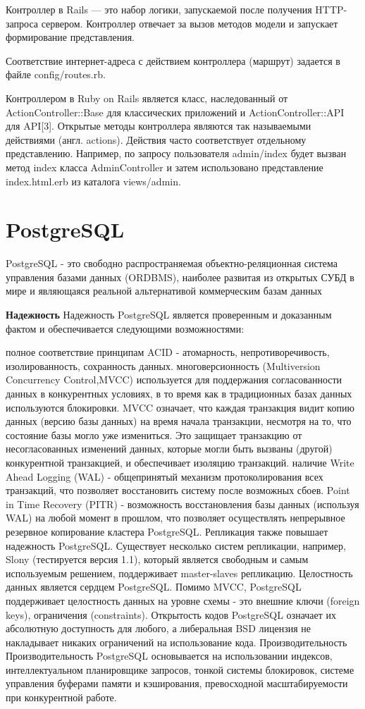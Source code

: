 Контроллер в Rails — это набор логики, запускаемой после получения HTTP-запроса сервером. Контроллер отвечает за вызов методов модели и запускает формирование представления.

Соответствие интернет-адреса с действием контроллера (маршрут) задается в файле config/routes.rb.

Контроллером в Ruby on Rails является класс, наследованный от ActionController::Base для классических приложений и ActionController::API для API[3]. Открытые методы контроллера являются так называемыми действиями (англ. actions). Действия часто соответствует отдельному представлению. Например, по запросу пользователя admin/index будет вызван метод index класса AdminController и затем использовано представление index.html.erb из каталога views/admin.

\section{PostgreSQL}\label{sec:ch3/sect3}
PostgreSQL - это свободно распространяемая объектно-реляционная система управления базами данных (ORDBMS), наиболее развитая из открытых СУБД в мире и являющаяся реальной альтернативой коммерческим базам данных

\textbf{Надежность} 
Надежность PostgreSQL является проверенным и доказанным фактом и обеспечивается следующими возможностями:

полное соответствие принципам ACID - атомарность, непротиворечивость, изолированность, сохранность данных.
многоверсионность (Multiversion Concurrency Control,MVCC) используется для поддержания согласованности данных в конкурентных условиях, в то время как в традиционных базах данных используются блокировки. MVCC означает, что каждая транзакция видит копию данных (версию базы данных) на время начала транзакции, несмотря на то, что состояние базы могло уже измениться. Это защищает транзакцию от несогласованных изменений данных, которые могли быть вызваны (другой) конкурентной транзакцией, и обеспечивает изоляцию транзакций.
наличие Write Ahead Logging (WAL) - общепринятый механизм протоколирования всех транзакций, что позволяет восстановить систему после возможных сбоев.
Point in Time Recovery (PITR) - возможность восстановления базы данных (используя WAL) на любой момент в прошлом, что позволяет осуществлять непрерывное резервное копирование кластера PostgreSQL.
Репликация также повышает надежность PostgreSQL. Существует несколько систем репликации, например, Slony (тестируется версия 1.1), который является свободным и самым используемым решением, поддерживает master-slaves репликацию.
Целостность данных является сердцем PostgreSQL. Помимо MVCC, PostgreSQL поддерживает целостность данных на уровне схемы - это внешние ключи (foreign keys), ограничения (constraints).
Открытость кодов PostgreSQL означает их абсолютную доступность для любого, а либеральная BSD лицензия не накладывает никаких ограничений на использование кода.
Производительность
Производительность PostgreSQL основывается на использовании индексов, интеллектуальном планировщике запросов, тонкой системы блокировок, системе управления буферами памяти и кэширования, превосходной масштабируемости при конкурентной работе.

